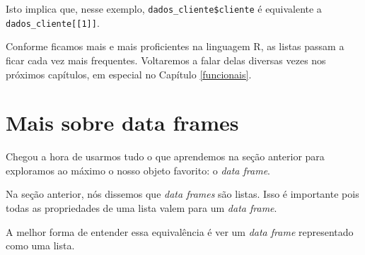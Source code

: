 \documentclass[]{book}
\begin{document}
Isto implica que, nesse exemplo, \texttt{dados\_cliente\$cliente} é equivalente a \texttt{dados\_cliente{[}{[}1{]}{]}}.

Conforme ficamos mais e mais proficientes na linguagem R, as listas passam a ficar cada vez mais frequentes. Voltaremos a falar delas diversas vezes nos próximos capítulos, em especial no Capítulo \ref{funcionais}.

\hypertarget{mais-sobre-data-frames}{%
\section{Mais sobre data frames}\label{mais-sobre-data-frames}}

Chegou a hora de usarmos tudo o que aprendemos na seção anterior para exploramos ao máximo o nosso objeto favorito: o \emph{data frame}.

Na seção anterior, nós dissemos que \emph{data frames} são listas. Isso é importante pois todas as propriedades de uma lista valem para um \emph{data frame}.

A melhor forma de entender essa equivalência é ver um \emph{data frame} representado como uma lista.
\end{document}
